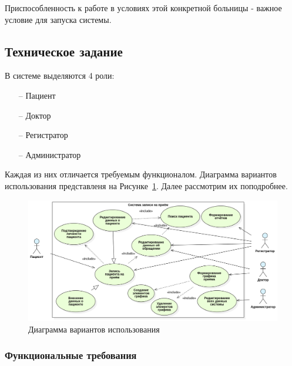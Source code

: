 \documentclass[a4paper,article]{article}
\begin{document}
        Приспособленность к работе в условиях этой конкретной больницы - важное условие для запуска системы.

    \subsection{Техническое задание}\label{Техническое задание}

        В системе выделяются 4 роли:

        \begin{itemize}[nolistsep]
            \item[--] Пациент
            \item[--] Доктор
            \item[--] Регистратор
            \item[--] Администратор
        \end{itemize}

        Каждая из них отличается требуемым функционалом. Диаграмма вариантов использования представленя на Рисунке~\ref{fig:Диаграмма вариантов использования}. Далее рассмотрим их поподробнее.

        \begin{figure}[h]

            \centering

            \includegraphics[width=0.8\linewidth]{Диаграмма вариантов использования.png}

            \caption{\centering Диаграмма вариантов использования}

            \label{fig:Диаграмма вариантов использования}

        \end{figure}

    \subsubsection{Функциональные требования}\label{ТЗ. Функциональные требования}
\end{document}
